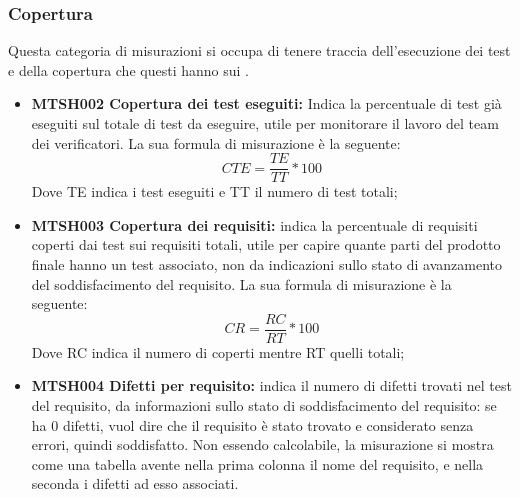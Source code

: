 \documentclass[NormeDiProgetto.tex]{subfiles}
\begin{document}
	\subsubsection{Copertura}
	Questa categoria di misurazioni si occupa di tenere traccia dell'esecuzione dei test e della copertura che questi hanno sui .
	\begin{itemize}
		\item \textbf{MTSH002 Copertura dei test eseguiti:} Indica la percentuale di test già eseguiti sul totale di test da eseguire, utile per monitorare il lavoro del team dei verificatori. La sua formula di misurazione è la seguente:
		\[CTE=\dfrac{TE}{TT}*100\]
		Dove TE indica i test eseguiti e TT il numero di test totali;
		\item \textbf{MTSH003 Copertura dei requisiti:} indica la percentuale di requisiti coperti dai test sui requisiti totali, utile per capire quante parti del prodotto finale hanno un test associato, non da indicazioni sullo stato di avanzamento del soddisfacimento del requisito. La sua formula di misurazione è la seguente:
		\[CR=\dfrac{RC}{RT}*100\]
		Dove RC indica il numero di  coperti mentre RT quelli totali;
		\item \textbf{MTSH004 Difetti per requisito:} indica il numero di difetti trovati nel test del requisito, da informazioni sullo stato di soddisfacimento del requisito: se ha 0 difetti, vuol dire che il requisito è stato trovato e considerato senza errori, quindi soddisfatto.
		Non essendo calcolabile, la misurazione si mostra come una tabella avente nella prima colonna il nome del requisito, e nella seconda i difetti ad esso associati.
	\end{itemize}

	
\end{document}
